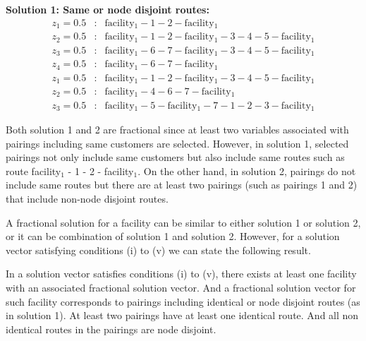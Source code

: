 \begin{example}
{\bf Solution 1: Same or node disjoint routes:}
\begin{eqnarray*}
  z_1 = 0.5 &: & \mbox{facility$_1$} - 1 - 2 - \mbox{facility$_1$} \\ 
  z_2 = 0.5 &: & \mbox{facility$_1$} - 1 - 2 - \mbox{facility$_1$} - 3 - 4 - 5 - \mbox{facility$_1$}\\
  z_3 = 0.5 &: & \mbox{facility$_1$} - 6 - 7 - \mbox{facility$_1$} - 3 - 4 - 5 - \mbox{facility$_1$} \\
  z_4 = 0.5 &: & \mbox{facility$_1$} - 6 - 7 - \mbox{facility$_1$}
\end{eqnarray*}
\hspace{0.7in}{\bf Solution 2: Different and non-disjoint paths:}
\begin{eqnarray*}
z_1 = 0.5 &: & \mbox{facility$_1$} - 1 - 2 - \mbox{facility$_1$} - 3 - 4 - 5 - \mbox{facility$_1$}\\
z_2 = 0.5 &: & \mbox{facility$_1$} - 4 - 6 - 7 - \mbox{facility$_1$} \\
z_3 = 0.5 &: & \mbox{facility$_1$} - 5 - \mbox{facility$_1$} - 7 - 1 - 2 - 3 - \mbox{facility$_1$} 
\end{eqnarray*}
\end{example}

Both solution 1 and 2 are fractional since at least two variables associated with
pairings including same customers are selected. However, in solution 1, 
selected pairings not only include same customers but also include same 
routes such as route facility$_1$ - 1 - 2 - facility$_1$.
On the other hand, in solution 2, pairings do not include same routes
but there are at least two pairings (such as pairings 1 and 2) that
include non-node disjoint routes. 

A fractional solution for a facility can be similar to either solution 1 or
solution 2, or it can be combination of solution 1 and solution 2.
However, for a solution vector satisfying conditions (i) to (v) we
can state the following result.

\begin{lemma} 
\label{ip-lp-rel}
In a solution vector satisfies conditions (i) to (v),  
there exists at least one facility with an associated fractional solution 
vector. And a fractional solution vector for such facility corresponds to pairings 
including identical or node disjoint routes (as in solution 1). 
At least two pairings have at least one identical route. And all non identical 
routes in the pairings are node disjoint. %
\end{lemma} 

